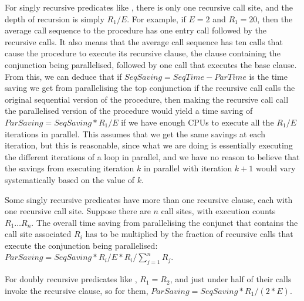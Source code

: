 For singly recursive predicates like \mapfoldl,
there is only one recursive call site,
and the depth of recursion is simply $R_1/E$.
For example, if $E = 2$ and $R_1 = 20$,
then the average call sequence to the procedure
has one entry call followed by the recursive calls.
It also means that the average call sequence
has ten calls that cause the procedure to execute its recursive clause,
the clause containing the conjunction being parallelised,
followed by one call that executes the base clause.
From this, we can deduce that if ${SeqSaving} = {SeqTime} - {ParTime}$
is the time saving we get from parallelising the top conjunction
if the recursive call calls the original sequential version of the procedure,
then making the recursive call call the parallelised version of the procedure
would yield a time saving of ${ParSaving} = {SeqSaving} * R_1/E$
if we have enough CPUs to execute all the $R_1/E$ iterations in parallel.
This assumes that we get the same savings at each iteration,
but this is reasonable,
since what we are doing is essentially executing
the different iterations of a loop in parallel,
and we have no reason to believe that the savings
from executing iteration $k$ in parallel with iteration $k+1$
would vary systematically based on the value of $k$.

Some singly recursive predicates have more than one recursive clause,
each with one recursive call site.
Suppose there are $n$ call sites, with execution counts $R_1 \ldots R_n$.
The overall time saving from parallelising the conjunct
that contains the call site associated $R_i$
has to be multiplied by the fraction of recursive calls
that execute the conjunction being parallelised:
${ParSaving} = {SeqSaving} * R_i/E * R_i/\sum_{j=1}^n R_j$.

For doubly recursive predicates like , $R_1 = R_2$,
and just under half of their calls invoke the recursive clause,
so for them, ${ParSaving} = {SeqSaving} * R_1/(2 * E)$.

